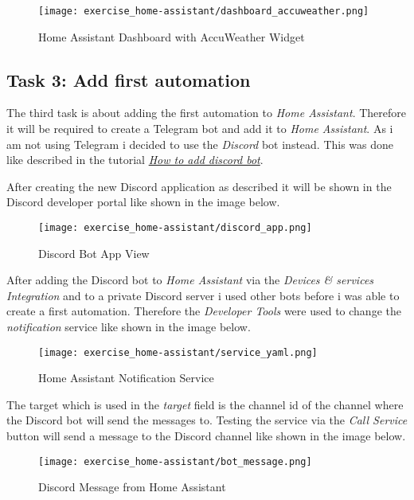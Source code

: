 \begin{figure}[H]
    \centering
    \texttt{[image: exercise\_home-assistant/dashboard\_accuweather.png]}
    \caption{Home Assistant Dashboard with AccuWeather Widget}
    \label{fig:home_assistant_dashboard_accuweather}
\end{figure}

\subsection{Task 3: Add first automation}
The third task is about adding the first automation to \textit{Home Assistant}.
Therefore it will be required to create a Telegram bot and add it to \textit{Home Assistant}. As i am not using 
Telegram i decided to use the \textit{Discord} bot instead. This was done like described in the tutorial 
\href{https://www.home-assistant.io/integrations/discord}{\textit{How to add discord bot}}.

After creating the new Discord application as described it will be shown in the Discord developer portal like 
shown in the image below.

\begin{figure}[H]
    \centering
    \texttt{[image: exercise\_home-assistant/discord\_app.png]}
    \caption{Discord Bot App View}
    \label{fig:discord_bot}
\end{figure}

After adding the Discord bot to \textit{Home Assistant} via the \textit{Devices \& services Integration} and to a 
private Discord server i used other bots before i was able to create a first automation.
Therefore the \textit{Developer Tools} were used to change the \textit{notification} service like shown in the 
image below.

\begin{figure}[H]
    \centering
    \texttt{[image: exercise\_home-assistant/service\_yaml.png]}
    \caption{Home Assistant Notification Service}
    \label{fig:home_assistant_notification_service}
\end{figure}

The target which is used in the \textit{target} field is the channel id of the channel where the Discord bot will 
send the messages to. Testing the service via the \textit{Call Service} button will send a message to the Discord 
channel like shown in the image below.

\begin{figure}[H]
    \centering
    \texttt{[image: exercise\_home-assistant/bot\_message.png]}
    \caption{Discord Message from Home Assistant}
    \label{fig:discord_message}
\end{figure}



